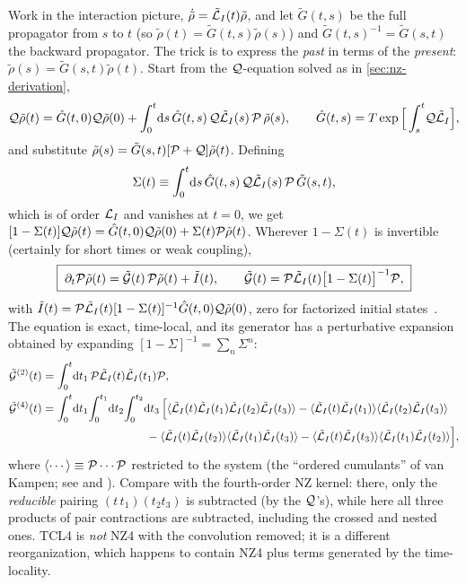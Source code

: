 Work in the interaction picture, $\dot{\tilde\rho}=\tilde{\mathcal{L}}_I(t)\tilde\rho$, and let $\tilde G(t,s)$ be the full propagator from $s$ to $t$ (so $\tilde\rho(t)=\tilde G(t,s)\tilde\rho(s)$) and $\tilde G(t,s)^{-1}=\tilde G(s,t)$ the backward propagator.
The trick is to express the \emph{past} in terms of the \emph{present}: $\tilde\rho(s)=\tilde G(s,t)\tilde\rho(t)$.
Start from the $\mathcal{Q}$-equation solved as in \cref{sec:nz-derivation},
\begin{equation}
  \mathcal{Q}\tilde\rho(t)=\hat G(t,0)\mathcal{Q}\tilde\rho(0)+\int_0^t\!\mathrm{d} s\,\hat G(t,s)\,\mathcal{Q}\tilde{\mathcal{L}}_I(s)\,\mathcal{P}\,\tilde\rho(s),
  \qquad \hat G(t,s)=T\exp\Big[\int_s^t\!\mathcal{Q}\tilde{\mathcal{L}}_I\Big],
\end{equation}
and substitute $\tilde\rho(s)=\tilde G(s,t)[\mathcal{P}+\mathcal{Q}]\tilde\rho(t)$.
Defining
\begin{equation}
  \Sigma(t)\equiv\int_0^t\!\mathrm{d} s\,\hat G(t,s)\,\mathcal{Q}\tilde{\mathcal{L}}_I(s)\,\mathcal{P}\,\tilde G(s,t),
\end{equation}
which is of order $\mathcal{L}_I$ and vanishes at $t=0$, we get $[1-\Sigma(t)]\mathcal{Q}\tilde\rho(t)=\hat G(t,0)\mathcal{Q}\tilde\rho(0)+\Sigma(t)\mathcal{P}\tilde\rho(t)$.
Wherever $1-\Sigma(t)$ is invertible (certainly for short times or weak coupling),
\begin{equation}
  \boxed{\;\partial_t\mathcal{P}\tilde\rho(t)=\tilde{\mathcal{G}}(t)\,\mathcal{P}\tilde\rho(t)+\tilde I(t),\qquad
  \tilde{\mathcal{G}}(t)=\mathcal{P}\tilde{\mathcal{L}}_I(t)\big[1-\Sigma(t)\big]^{-1}\mathcal{P},\;}
  \label{eq:TCL}
\end{equation}
with $\tilde I(t)=\mathcal{P}\tilde{\mathcal{L}}_I(t)[1-\Sigma(t)]^{-1}\hat G(t,0)\mathcal{Q}\tilde\rho(0)$, zero for factorized initial states~\cite[Sec.~9.2]{BreuerPetruccione}.
The equation is exact, time-local, and its generator has a perturbative expansion obtained by expanding $[1-\Sigma]^{-1}=\sum_n\Sigma^n$:
\begin{align}
  \tilde\Gc^{(2)}(t)&=\int_0^t\!\dd t_1\,\Pc\tilde\Lc_I(t)\tilde\Lc_I(t_1)\Pc ,
  \label{eq:TCL2}\\
  \tilde\Gc^{(4)}(t)&=\int_0^t\!\dd t_1\!\int_0^{t_1}\!\dd t_2\!\int_0^{t_2}\!\dd t_3\,
  \Big[\avg{\tilde\Lc_I(t)\tilde\Lc_I(t_1)\tilde\Lc_I(t_2)\tilde\Lc_I(t_3)}
  -\avg{\tilde\Lc_I(t)\tilde\Lc_I(t_1)}\avg{\tilde\Lc_I(t_2)\tilde\Lc_I(t_3)}\notag\\
  &\hspace{3.2cm}-\avg{\tilde\Lc_I(t)\tilde\Lc_I(t_2)}\avg{\tilde\Lc_I(t_1)\tilde\Lc_I(t_3)}
  -\avg{\tilde\Lc_I(t)\tilde\Lc_I(t_3)}\avg{\tilde\Lc_I(t_1)\tilde\Lc_I(t_2)}\Big],
  \label{eq:TCL4}
\end{align}
where $\langle\cdots\rangle\equiv\mathcal{P}\cdots\mathcal{P}$ restricted to the system (the ``ordered cumulants'' of van Kampen; see \cite[Sec.~9.2.4]{BreuerPetruccione} and \cite{BreuerKapplerPetruccione2001}).
Compare with the fourth-order NZ kernel: there, only the \emph{reducible} pairing $(t\,t_1)(t_2t_3)$ is subtracted (by the $\mathcal{Q}$'s), while here all three products of pair contractions are subtracted, including the crossed and nested ones.
TCL4 is \emph{not} NZ4 with the convolution removed; it is a different reorganization, which happens to contain NZ4 plus terms generated by the time-locality.

